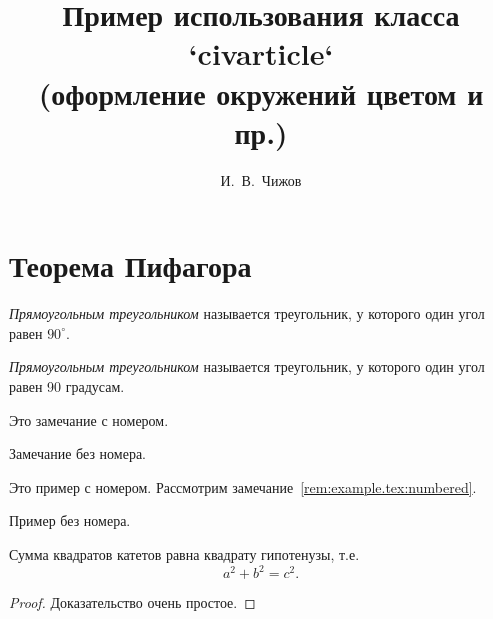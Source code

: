 \documentclass[colorthm, toc]{../civarticle}
\title{
    Пример использования класса `civarticle`\\
    \small{(оформление окружений цветом и пр.)}
}
\author{И.~В.~Чижов}
\begin{document}
\blindmathtrue
\section{Теорема Пифагора}
\label{sec:thm-pif}

\begin{definition}\label{def:example.tex:triange}
  \emph{Прямоугольным треугольником} называется треугольник, у
  которого один угол равен \(90^{\circ}\).
\end{definition}

\Blindtext[2]

\begin{definition*}
  \emph{Прямоугольным треугольником} называется треугольник, у
  которого один угол равен 90 градусам.
\end{definition*}

\blindmathtrue\blindmathpaper

\begin{remark} \label{rem:example.tex:numbered}
  Это замечание с номером.
  \blindtext%
\end{remark}

\Blindtext[2]

\begin{remark*}
  Замечание без номера.

  \Blindtext[2]
\end{remark*}

\Blindtext[2]

\begin{example}\label{ex:example:myexample}
  Это пример с номером.
  Рассмотрим замечание~\ref{rem:example.tex:numbered}.
  \Blindtext[2]
\end{example}

\Blindtext[2]

\blinditemize%

\blindenumerate%

\blinddescription%

\begin{example*}
  Пример без номера.
  \Blindtext[2]
\end{example*}

\Blindtext[2]

\begin{theorem}
  Сумма квадратов катетов равна квадрату гипотенузы, т.е.
  \begin{equation}
    \label{eq:thm-pif}
    a^2+b^2=c^2.
  \end{equation}
\end{theorem}
\begin{proof}
  Доказательство очень простое.
\end{proof}
\end{document}
